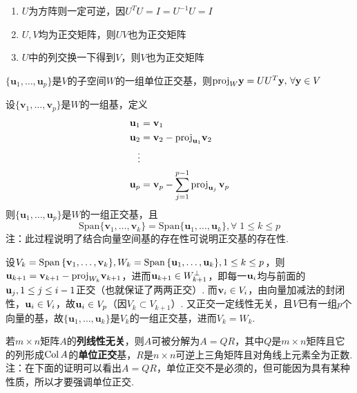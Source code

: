\begin{proposition}
\begin{enumerate}
	\itemsep -3pt
	\item $U$为方阵则一定可逆，因$U^TU=I=U^{-1}U=I$
	\item $U,V$均为正交矩阵，则$UV$也为正交矩阵
	\item $U$中的列交换一下得到$V$，则$V$也为正交矩阵
\end{enumerate}
\end{proposition}
\begin{proposition}
$\{\mathbf{u}_1,\dots,\mathbf{u}_p\}$是$V$的子空间$W$的一组单位正交基，则$\mathrm{proj}_{W}\mathbf{y}=UU^T\mathbf{y},\,\forall\mathbf{y}\in V$
\end{proposition}
\begin{myalgorithm}
\label{schmidt}
设$\{\mathbf{v}_1,\dots,\mathbf{v}_p\}$是$W$的一组基，定义
\[\begin{aligned}\mathbf {u} _{1}&=\mathbf {v} _{1}\\
\mathbf {u} _{2}&=\mathbf {v} _{2}-\mathrm {proj} _{\mathbf {u} _{1}}\mathbf{v}_2\\
\vdots\\
\mathbf {u} _{p}&=\mathbf {v} _{p}-\sum _{j=1}^{p-1}\mathrm {proj} _{\mathbf {u} _{j}}\,\mathbf {v} _{p}\end{aligned}\]
则$\{\mathbf{u}_1,\dots,\mathbf{u}_p\}$是$W$的一组正交基，且
\[\mathrm{Span}\{\mathbf{v}_1,\dots,\mathbf{v}_k\}=\mathrm{Span}\{\mathbf{u}_1,\dots,\mathbf{u}_k\},\forall\;1\leq k\leq p\]
注：此过程说明了结合向量空间基的存在性可说明正交基的存在性.
\end{myalgorithm}
\begin{analysis}
设$V_k=\mathrm{Span}\,\{\mathbf{v}_1,\dots,\mathbf{v}_k\},W_k=\mathrm{Span}\,\{\mathbf{u}_1,\dots,\mathbf{u}_k\},1\leq k\leq p$，则$\mathbf{u}_{k+1}=\mathbf{v}_{k+1}-\mathrm{proj}_{W_k}\mathbf{v}_{k+1}$，进而$\mathbf{u}_{k+1}\in W_{k+1}^\perp$，即每一$\mathbf{u}_i$均与前面的$\mathbf{u}_j,1\leq j\leq i-1$正交（也就保证了两两正交）. 而$\mathbf{v}_i\in V_i$，由向量加减法的封闭性，$\mathbf{u}_i\in V_i$，故$\mathbf{u}_i\in V_p$（因$V_k\subset V_{k+1}$）. 又正交一定线性无关，且$V$已有一组$p$个向量的基，故$\{\mathbf{u}_1,\dots,\mathbf{u}_k\}$是$V_k$的一组正交基，进而$V_k=W_k$.\\
\end{analysis}
\begin{theorem}[QR分解]
\label{qr_fact}
若$m\times n$矩阵$A$的\textbf{列线性无关}，则$A$可被分解为$A=QR$，其中$Q$是$m\times n$矩阵且它的列形成$\mathrm{Col}\, A$的\textbf{单位正交}基，$R$是$n\times n$可逆上三角矩阵且对角线上元素全为正数.\\
注：在下面的证明可以看出$A=QR$，单位正交不是必须的，但可能因为具有某种性质，所以才要强调单位正交.
\end{theorem}
